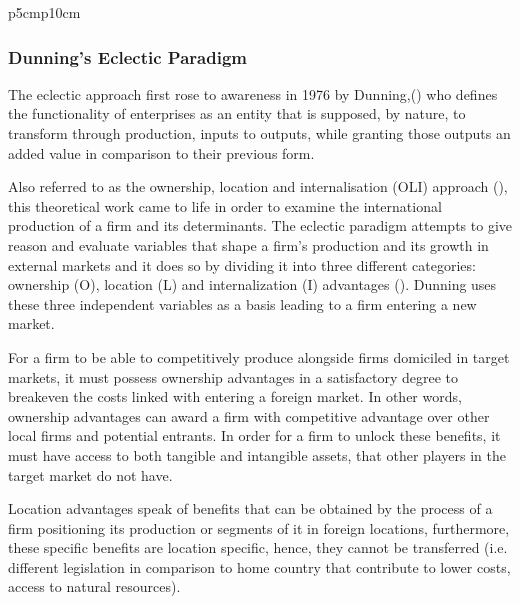 \documentclass[11pt,a4paper]{article}
\begin{document}
{\begin{table}[H]
\begin{tabular}{p{5cm}p{10cm}}
\bottomrule
\end{tabular}
\vspace{5mm}
\captionsetup{width=0.7\linewidth}
\caption{The Uppsala Model of Internationalisation: Consolidated Representation of Factors (Author's Compilation)} 
\label{table:uppsala_factors}
\end{table} 



\subsubsection{Dunning's Eclectic Paradigm}
The eclectic approach first rose to awareness in 1976 by Dunning,(\cite{eclectic_paradigm_dunning_extension}) who defines the functionality of enterprises as an entity that is supposed, by nature, to transform through production, inputs to outputs, while granting those outputs an added value in comparison to their previous form. \par
Also referred to as the ownership, location and internalisation (OLI) approach (\cite{eclectic_paradigm_dunning}), this theoretical work came to life in order to examine the international production of a firm and its determinants. The eclectic paradigm attempts to give reason and evaluate variables that shape a firm's production and its growth in external markets and it does so by dividing it into three different categories: ownership (O), location (L) and internalization (I) advantages (\cite{Dunning_moremore}). Dunning uses these three independent variables as a basis leading to a firm entering a new market. \par
For a firm to be able to competitively produce alongside firms domiciled in target markets, it must possess ownership advantages in a satisfactory degree to breakeven the costs linked with entering a foreign market. In other words, ownership advantages can award a firm with competitive advantage over other local firms and potential entrants. In order for a firm to unlock these benefits, it must have access to both tangible and intangible assets, that other players in the target market do not have.  \par
Location advantages speak of benefits that can be obtained by the process of a firm positioning its production or segments of it in foreign locations, furthermore, these specific benefits are location specific, hence, they cannot be transferred (i.e. different legislation in comparison to home country that contribute to lower costs, access to natural resources). \par
}
\end{document}

